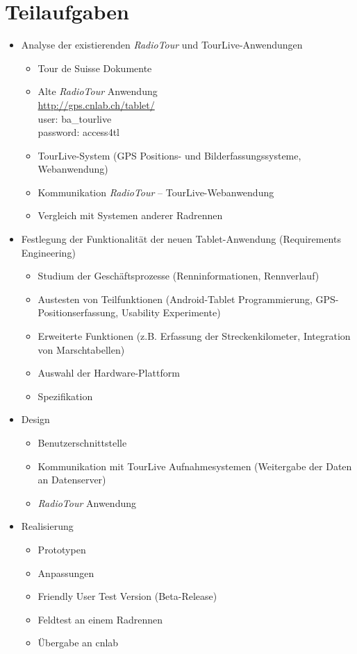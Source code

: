 \section*{Teilaufgaben}
\begin{itemize}
\item Analyse der existierenden \textit{RadioTour} und TourLive-Anwendungen
\begin{itemize}
\item Tour de Suisse Dokumente
\item Alte \textit{RadioTour} Anwendung\\
\url{http://gps.cnlab.ch/tablet/}\\
user: ba\_tourlive\\
password: access4tl
\item TourLive-System (GPS Positions- und Bilderfassungssysteme, Webanwendung)
\item Kommunikation \textit{RadioTour} – TourLive-Webanwendung
\item Vergleich mit Systemen anderer Radrennen 
\end{itemize}

\item Festlegung der Funktionalität der neuen Tablet-Anwendung (Requirements Engineering)
\begin{itemize}
\item Studium der Geschäftsprozesse (Renninformationen, Rennverlauf)
\item Austesten von Teilfunktionen (Android-Tablet Programmierung, GPS-Positionserfassung, Usability Experimente)
\item Erweiterte Funktionen (z.B. Erfassung der Streckenkilometer, Integration von Marschtabellen)
\item Auswahl der Hardware-Plattform
\item Spezifikation
\end{itemize}

\item Design
\begin{itemize}
\item Benutzerschnittstelle
\item Kommunikation mit TourLive Aufnahmesystemen (Weitergabe der Daten an Datenserver)
\item \textit{RadioTour} Anwendung
\end{itemize}

\item Realisierung
\begin{itemize}
\item Prototypen
\item Anpassungen
\item Friendly User Test Version (Beta-Release)
\item Feldtest an einem Radrennen
\item Übergabe an cnlab
\end{itemize}


\end{itemize}

